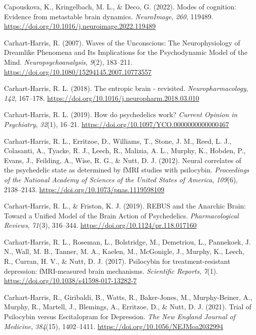 \begin{CSLReferences}{1}{0}
Capouskova, K., Kringelbach, M. L., \& Deco, G. (2022). Modes of
cognition: Evidence from metastable brain dynamics. \emph{NeuroImage},
\emph{260}, 119489.
\url{https://doi.org/10.1016/j.neuroimage.2022.119489}

Carhart-Harris, R. (2007). Waves of the Unconscious: The Neurophysiology
of Dreamlike Phenomena and Its Implications for the Psychodynamic Model
of the Mind. \emph{Neuropsychoanalysis}, \emph{9}(2), 183--211.
\url{https://doi.org/10.1080/15294145.2007.10773557}

Carhart-Harris, R. L. (2018). The entropic brain - revisited.
\emph{Neuropharmacology}, \emph{142}, 167--178.
\url{https://doi.org/10.1016/j.neuropharm.2018.03.010}

Carhart-Harris, R. L. (2019). How do psychedelics work? \emph{Current
Opinion in Psychiatry}, \emph{32}(1), 16--21.
\url{https://doi.org/10.1097/YCO.0000000000000467}

Carhart-Harris, R. L., Erritzoe, D., Williams, T., Stone, J. M., Reed,
L. J., Colasanti, A., Tyacke, R. J., Leech, R., Malizia, A. L., Murphy,
K., Hobden, P., Evans, J., Feilding, A., Wise, R. G., \& Nutt, D. J.
(2012). Neural correlates of the psychedelic state as determined by fMRI
studies with psilocybin. \emph{Proceedings of the National Academy of
Sciences of the United States of America}, \emph{109}(6), 2138--2143.
\url{https://doi.org/10.1073/pnas.1119598109}

Carhart-Harris, R. L., \& Friston, K. J. (2019). REBUS and the Anarchic
Brain: Toward a Unified Model of the Brain Action of Psychedelics.
\emph{Pharmacological Reviews}, \emph{71}(3), 316--344.
\url{https://doi.org/10.1124/pr.118.017160}

Carhart-Harris, R. L., Roseman, L., Bolstridge, M., Demetriou, L.,
Pannekoek, J. N., Wall, M. B., Tanner, M. A., Kaelen, M., McGonigle, J.,
Murphy, K., Leech, R., Curran, H. V., \& Nutt, D. J. (2017). Psilocybin
for treatment-resistant depression: fMRI-measured brain mechanisms.
\emph{Scientific Reports}, \emph{7}(1).
\url{https://doi.org/10.1038/s41598-017-13282-7}

Carhart-Harris, R., Giribaldi, B., Watts, R., Baker-Jones, M.,
Murphy-Beiner, A., Murphy, R., Martell, J., Blemings, A., Erritzoe, D.,
\& Nutt, D. J. (2021). Trial of Psilocybin versus Escitalopram for
Depression. \emph{The New England Journal of Medicine}, \emph{384}(15),
1402--1411. \url{https://doi.org/10.1056/NEJMoa2032994}


\end{CSLReferences}
